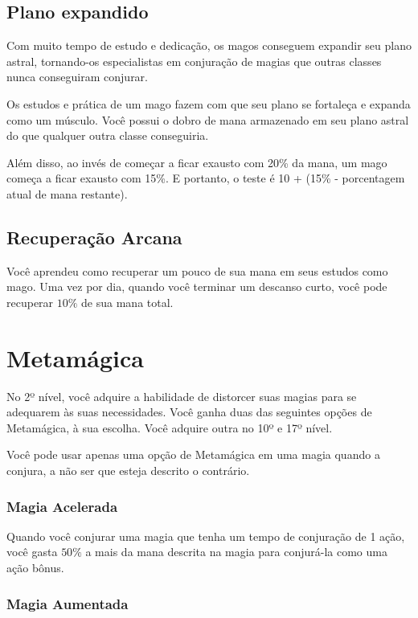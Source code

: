 \documentclass{RPG_Adventure}[2021/10/20]
\begin{document}
\begin{multicols}{2}
\subsection*{Plano expandido}%

Com muito tempo de estudo e dedicação, os magos conseguem expandir seu plano
astral, tornando-os especialistas em conjuração de magias que outras classes
nunca conseguiram conjurar.

Os estudos e prática de um mago fazem com que seu plano se fortaleça e expanda
como um músculo. Você possui o dobro de mana armazenado em seu plano astral do
que qualquer outra classe conseguiria.

Além disso, ao invés de começar a ficar exausto com 20\% da mana, um mago
começa a ficar exausto com 15\%. E portanto, o teste é 10 + (15\% - porcentagem
atual de mana restante).

\subsection*{Recuperação Arcana}%

Você aprendeu como recuperar um pouco de sua mana em seus estudos como mago. Uma
vez por dia, quando você terminar um descanso curto, você pode recuperar $10\%$
de sua mana total.

\section*{Metamágica}%

No 2º nível, você adquire a habilidade de distorcer suas magias para se
adequarem às suas necessidades. Você ganha duas das seguintes opções de
Metamágica, à sua escolha. Você adquire outra no 10º e 17º nível.

Você pode usar apenas uma opção de Metamágica em uma magia quando a conjura, a
não ser que esteja descrito o contrário.

\subsubsection*{Magia Acelerada}%

Quando você conjurar uma magia que tenha um tempo de conjuração de 1 ação, você
gasta $50\%$ a mais da mana descrita na magia para conjurá-la como uma ação
bônus.

\subsubsection*{Magia Aumentada}%


\end{multicols}
\end{document}
